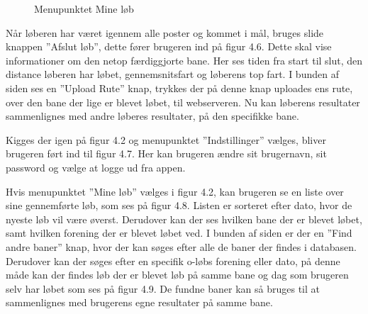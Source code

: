 \begin{figure}
\begin{minipage}{.5\textwidth}
  \caption{Menupunktet Mine løb}
  \label{fig:test2}
\end{minipage}
\end{figure}

Når løberen har været igennem alle poster og kommet i mål, bruges slide knappen ”Afslut løb”, dette fører brugeren ind på figur 4.6. Dette skal vise informationer om den netop færdiggjorte bane. Her ses tiden fra start til slut, den distance løberen har løbet, gennemsnitsfart og løberens top fart. I bunden af siden ses en ”Upload Rute” knap, trykkes der på denne knap uploades ens rute, over den bane der lige er blevet løbet, til webserveren. Nu kan løberens resultater sammenlignes med andre løberes resultater, på den specifikke bane.

Kigges der igen på figur 4.2 og menupunktet ”Indstillinger” vælges, bliver brugeren ført ind til figur 4.7. Her kan brugeren ændre sit brugernavn, sit password og vælge at logge ud fra appen.

Hvis menupunktet ”Mine løb” vælges i figur 4.2, kan brugeren se en liste over sine gennemførte løb, som ses på figur 4.8. Listen er sorteret efter dato, hvor de nyeste løb vil være øverst. Derudover kan der ses hvilken bane der er blevet løbet, samt hvilken forening der er blevet løbet ved. I bunden af siden er der en ”Find andre baner” knap, hvor der kan søges efter alle de baner der findes i databasen. Derudover kan der søges efter en specifik o-løbs forening eller dato, på denne måde kan der findes løb der er blevet løb på samme bane og dag som brugeren selv har løbet som ses på figur 4.9. De fundne baner kan så bruges til at sammenlignes med brugerens egne resultater på samme bane.

